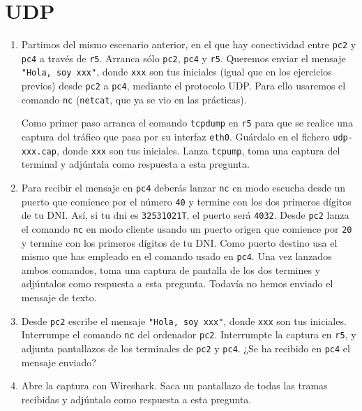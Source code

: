 \documentclass[a4paper]{article}
\begin{document}

\section{UDP}
\label{sec:udp}

\begin{enumerate}[resume]
	\item Partimos del mismo escenario anterior, en el que hay conectividad entre \texttt{pc2} y 
	\texttt{pc4} a través de \texttt{r5}. Arranca sólo \texttt{pc2}, \texttt{pc4} y \texttt{r5}. Queremos enviar 
	el mensaje \texttt{"Hola, soy xxx"}, donde \texttt{xxx} son tus iniciales (igual que en los ejercicios 
	previos) desde \texttt{pc2} a \texttt{pc4}, mediante el protocolo UDP. Para ello usaremos el 
	comando \texttt{nc} (\texttt{netcat}, que ya se vio en las prácticas). 
	
	Como primer paso arranca el comando \texttt{tcpdump} en \texttt{r5} para que se realice una 
	captura del tráfico que pasa por su interfaz \texttt{eth0}. Guárdalo en el fichero \texttt{udp-xxx.cap}, 
	donde \texttt{xxx} son tus iniciales. Lanza \texttt{tcpump}, toma una captura del terminal y 
	adjúntala como respuesta a esta pregunta.
	
	\item Para recibir el mensaje en \texttt{pc4} deberás lanzar \texttt{nc} en modo escucha desde un 
	puerto que comience por el número \texttt{40} y termine con los dos primeros dígitos de tu DNI. Así, 
	si tu dni es \texttt{32531021T}, el puerto será \texttt{4032}. Desde \texttt{pc2} lanza el comando 
	\texttt{nc} en modo cliente usando un puerto origen que comience por \texttt{20} y termine con 
	los primeros dígitos de tu DNI. Como puerto destino usa el mismo que has empleado en el comando 
	usado en \texttt{pc4}. Una vez lanzados ambos comandos, toma una captura de pantalla de los dos 
	termines y adjúntalos como respuesta a esta pregunta. Todavía no hemos enviado el mensaje de texto.
	
	\item Desde \texttt{pc2} escribe el mensaje \texttt{"Hola, soy xxx"}, donde \texttt{xxx} son tus iniciales. 
	Interrumpe el comando \texttt{nc} del ordenador \texttt{pc2}. Interrumpte la captura en \texttt{r5}, 
	y adjunta pantallazos de los terminales de \texttt{pc2} y \texttt{pc4}. ¿Se ha recibido en \texttt{pc4} 
	el mensaje enviado?
	
	\item Abre la captura con Wireshark. Saca un pantallazo de todas las tramas recibidas y adjúntalo 
	como respuesta a esta pregunta.
	

\end{enumerate}
\end{document}
